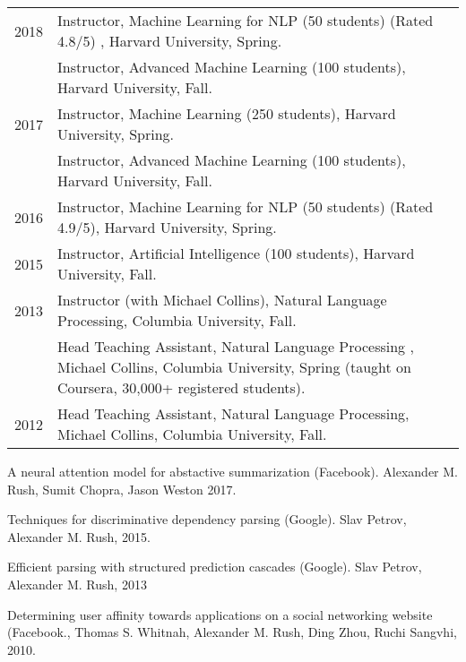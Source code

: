 \documentclass[10pt]{article}
\begin{document}
{\begin{tabular}{lp{11.5cm}}
	2018      & \ind  Instructor, Machine Learning for NLP (50 students) (Rated 4.8/5) , Harvard University, Spring.                                                        \\
	          & \ind  Instructor, Advanced Machine Learning (100 students), Harvard University, Fall.                                                                       \\
	2017      & \ind  Instructor, Machine Learning (250 students), Harvard University, Spring.                                                                              \\
	          & \ind  Instructor, Advanced Machine Learning (100 students), Harvard University, Fall.                                                                       \\
	2016      & \ind  Instructor, Machine Learning for NLP (50 students) (Rated 4.9/5), Harvard University, Spring.                                                         \\
	2015      & \ind  Instructor, Artificial Intelligence (100 students), Harvard University, Fall.                                                                         \\
	2013      & \ind  Instructor (with Michael Collins), Natural Language Processing, Columbia University, Fall.                                                            \\
	          & \ind Head Teaching Assistant, Natural Language Processing , Michael Collins, Columbia University, Spring (taught on Coursera, 30,000+ registered students). \\
	2012      & \ind Head Teaching Assistant, Natural Language Processing, Michael Collins, Columbia University, Fall.                                                      \\
\end{tabular}

\bigskip
{}

\ind A neural attention model for abstactive summarization (Facebook). Alexander M. Rush, Sumit Chopra, Jason Weston 2017.
\medskip

\ind Techniques for discriminative dependency parsing (Google). Slav Petrov, Alexander M. Rush, 2015.
\medskip

\ind Efficient parsing with structured prediction cascades (Google). Slav Petrov, Alexander M. Rush, 2013
\medskip

\ind  Determining user affinity towards applications on a social networking website (Facebook., Thomas S. Whitnah, Alexander M. Rush, Ding Zhou, Ruchi Sangvhi, 2010.



}
\end{document}
